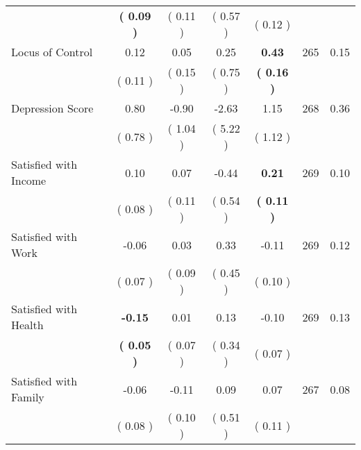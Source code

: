 \begin{tabular}{lcccccc}
 & \textbf{(     0.09 )} & (     0.11 ) & (     0.57 ) & (     0.12 ) & \\
Locus of Control &      0.12 &      0.05 &      0.25 & \textbf{     0.43} & 265 &      0.15 \\ 
 & (     0.11 ) & (     0.15 ) & (     0.75 ) & \textbf{(     0.16 )} & \\
Depression Score &      0.80 &     -0.90 &     -2.63 &      1.15 & 268 &      0.36 \\ 
 & (     0.78 ) & (     1.04 ) & (     5.22 ) & (     1.12 ) & \\
Satisfied with Income &      0.10 &      0.07 &     -0.44 & \textbf{     0.21} & 269 &      0.10 \\ 
 & (     0.08 ) & (     0.11 ) & (     0.54 ) & \textbf{(     0.11 )} & \\
Satisfied with Work &     -0.06 &      0.03 &      0.33 &     -0.11 & 269 &      0.12 \\ 
 & (     0.07 ) & (     0.09 ) & (     0.45 ) & (     0.10 ) & \\
Satisfied with Health & \textbf{    -0.15} &      0.01 &      0.13 &     -0.10 & 269 &      0.13 \\ 
 & \textbf{(     0.05 )} & (     0.07 ) & (     0.34 ) & (     0.07 ) & \\
Satisfied with Family &     -0.06 &     -0.11 &      0.09 &      0.07 & 267 &      0.08 \\ 
 & (     0.08 ) & (     0.10 ) & (     0.51 ) & (     0.11 ) & \\
\bottomrule
\end{tabular}
